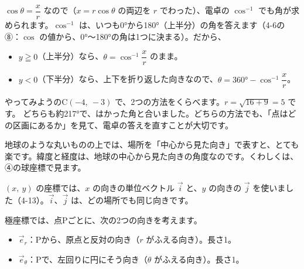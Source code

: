 $\cos\theta=\dfrac{x}{r}$ なので（$x=r\cos\theta$ の両辺を $r$ でわった）、電卓の $\cos^{-1}$ でも角が求められます。$\cos^{-1}$ は、いつも0°から180°（上半分）の角を答えます（4-6の⑧：$\cos$ の値から、0°〜180°の角は1つに決まる）。だから、
\begin{itemize}[leftmargin=1.2\zw, itemsep=1pt, topsep=2pt, label={\color{\bkTT}●}]
\item $y\geqq0$（上半分）なら、$\theta=\cos^{-1}\dfrac{x}{r}$ のまま。
\item $y<0$（下半分）なら、上下を折り返した向きなので、$\theta=360°-\cos^{-1}\dfrac{x}{r}$。
\end{itemize}
やってみようのC$(-4,\ -3)$ で、2つの方法をくらべます。$r=\sqrt{16+9}=5$ です。
どちらも約217°で、はかった角と合いました。どちらの方法でも、「点はどの区画にあるか」を見て、電卓の答えを直すことが大切です。

地球のような丸いものの上では、場所を「中心から見た向き」で表すと、とても楽です。緯度と経度は、地球の中心から見た向きの角度なのです。くわしくは、④の球座標で見ます。


\label{bk:4-15:er}
$(x,\ y)$ の座標では、$x$ の向きの単位ベクトル $\vec i$ と、$y$ の向きの $\vec j$ を使いました（4-13）。$\vec i$、$\vec j$ は、どの場所でも同じ向きです。

極座標では、点Pごとに、次の2つの向きを考えます。
\begin{itemize}[leftmargin=1.2\zw, itemsep=2pt, topsep=2pt, label={\color{\bkTT}●}]
\item $\vec e_r$：Pから、原点と反対の向き（$r$ がふえる向き）。長さ1。
\item $\vec e_\theta$：Pで、左回りに円にそう向き（$\theta$ がふえる向き）。長さ1。
\end{itemize}

